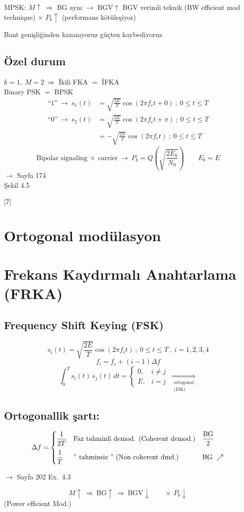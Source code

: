 \documentclass[11pt,a4paper]{article}
\begin{document}
MPSK: $M\uparrow\ \Rightarrow$ BG aynı $\rightarrow$ BGV$\uparrow$ \qquad BGV verimli teknik (BW efficient mod technique) \qquad $\times$ $P_b\uparrow$ (performans kötüleşiyor)

Bant genişliğinden kazanıyoruz güçten kaybediyoruz

\subsection{Özel durum}
$k=1,\ M=2\ \Rightarrow$ İkili FKA $=$ İFKA\\
\hspace*{4em}Binary PSK $=$ BPSK
\begin{align*}
\text{``1''}\ \rightarrow\ s_1(t)&=\sqrt{\tfrac{2E}{T}}\cos(2\pi f_ct+0)\ ;\ 0\le t\le T\\
\text{``0''}\ \rightarrow\ s_2(t)&=\sqrt{\tfrac{2E}{T}}\cos(2\pi f_ct+\pi)\ ;\ 0\le t\le T\\
&=-\sqrt{\tfrac{2E}{T}}\cos(2\pi f_ct)\ ;\ 0\le t\le T
\end{align*}
\[ \text{Bipolar signaling}\ \times\ \text{carrier}\ \rightarrow\ P_b=Q\!\left(\sqrt{\frac{2E_b}{N_0}}\right)\qquad E_b=E \]
$\rightarrow$ Sayfa 174\\ Şekil 4.5

[7]

\section{Ortogonal modülasyon}
\section{Frekans Kaydırmalı Anahtarlama (FRKA)}
\subsection{Frequency Shift Keying (FSK)}
\[ s_i(t)=\sqrt{\frac{2E}{T}}\cos(2\pi f_it)\ ;\ 0\le t\le T\ ,\ i=1,2,3,4 \]
\[ f_i=f_c+(i-1)\Delta f \]
\[ \int_0^T s_i(t)\,s_j(t)\,dt=\begin{cases}0, & i\ne j\\ E, & i=j\end{cases}\ \underset{\substack{\text{ortogonal}\\ \text{(Dik)}}}{\Rightarrow} \]

\subsection{Ortogonallik şartı:}
\[
\Delta f=\left\{\begin{array}{@{}l@{\quad}l@{\quad}l@{}}
\dfrac{1}{2T} & \text{Faz tahminli demod. (Coherent demod.)} & \dfrac{\mathrm{BG}}{2}\\[10pt]
\dfrac{1}{T} & \text{'' tahminsiz '' (Non coherent dmd.)} & \mathrm{BG}\ \nearrow
\end{array}\right.
\]

$\rightarrow$ Sayfa 202 Ex.\ 4.3

\[ M\uparrow\ \Rightarrow\ \mathrm{BG}\uparrow\ \Rightarrow\ \mathrm{BGV}\downarrow\qquad\times\ P_b\downarrow \]
(Power efficient Mod.)
\end{document}
